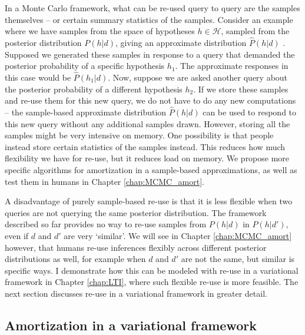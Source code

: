 In a Monte Carlo framework, what can be re-used query to query are the samples themselves -- or certain summary statistics of the samples. Consider an example where we have samples from the space of hypotheses $h \in \mathcal{H}$, sampled from the posterior distribution $P(h | d)$, giving an approximate distribution $\hat{P}(h | d)$ . Supposed we generated these samples in response to a query that demanded the posterior probability of a specific hypothesis $h_1$. The approximate responses in this case would be $\hat{P}(h_1 |d)$. Now, suppose we are asked another query about the posterior probability of a different hypothesis $h_2$. If we store these samples and re-use them for this new query, we do not have to do any new computations -- the sample-based approximate distribution $\hat{P}(h | d)$ can be used to respond to this new query without any additional samples drawn. However, storing all the samples might be very intensive on memory. One possibility is that people instead store certain statistics of the samples instead. This reduces how much flexibility we have for re-use, but it reduces load on memory. We propose more specific algorithms for amortization in a sample-based approximations, as well as test them in humans in Chapter \ref{chap:MCMC_amort}.

A disadvantage of purely sample-based re-use is that it is less flexible when two queries are not querying the same posterior distribution. The framework described so far provides no way to re-use samples from $P(h | d)$ in $P(h | d')$, even if $d$ and $d'$ are very `similar'. We will see in Chapter \ref{chap:MCMC_amort} however, that humans re-use inferences flexibly across different posterior distributions as well, for example when $d$ and $d'$ are not the same, but similar is specific ways. I demonstrate how this can be modeled with re-use in a variational framework in Chapter \ref{chap:LTI}, where such flexible re-use is more feasible. The next section discusses re-use in a variational framework in greater detail.

\subsection{Amortization in a variational framework} 

